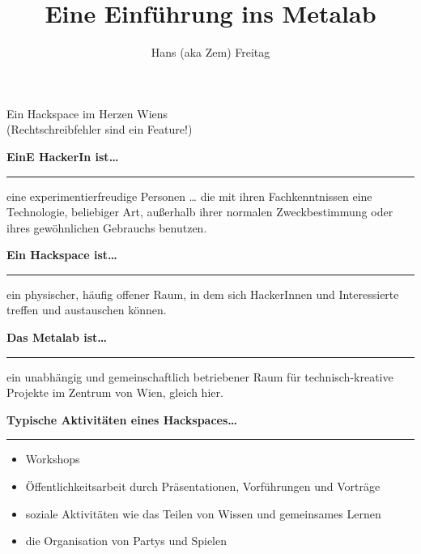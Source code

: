 \documentclass{seminar}
\title{Eine Einführung ins Metalab}
\author{ Hans (aka Zem) Freitag }
\providecommand{\T}[1]{
	\begin{center}
		{\bf #1}
	\end{center}
	\vspace{2mm}
	\hrule
	\vspace{2mm}
}
\begin{document}
\pagestyle{empty}
\centerslidestrue
\begin{slide}
	\maketitle
	\begin{center}
		Ein Hackspace im Herzen Wiens\\
		{\sf (Rechtschreibfehler sind ein Feature!)}
	\end{center}
\end{slide}
\centerslidesfalse

\pagestyle{mypagestyle}

\begin{slide}
	\T{EinE HackerIn ist\ldots}
	eine experimentierfreudige Personen \ldots \pause
	die mit ihren Fachkenntnissen eine Technologie, beliebiger Art, außerhalb ihrer 
   normalen Zweckbestimmung oder ihres gewöhnlichen Gebrauchs benutzen.
\end{slide}

\begin{slide}
	\T{Ein Hackspace ist\ldots}
	ein physischer, häufig offener Raum, in dem sich HackerInnen und Interessierte treffen 
	und austauschen können. \\ 
\end{slide}

\begin{slide}
	\T{Das Metalab ist\ldots}
	ein unabhängig und gemeinschaftlich betriebener Raum für technisch-kreative 
	Projekte im Zentrum von Wien, gleich hier.
\end{slide}

\begin{slide}
	\T{Typische Aktivitäten eines Hackspaces\ldots}
	\begin{itemize}
		\item Workshops \pause
		\item Öffentlichkeitsarbeit durch Präsentationen, Vorführungen und Vorträge \pause
		\item soziale Aktivitäten wie das Teilen von Wissen und gemeinsames Lernen \pause
		\item die Organisation von Partys und Spielen \pause
	\end{itemize}
\end{slide}
\end{document}
